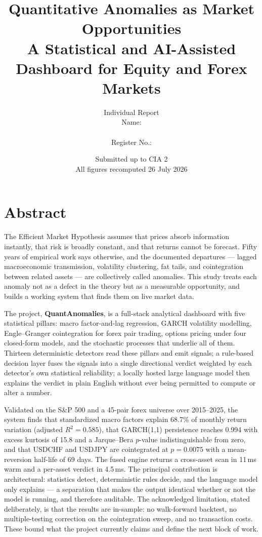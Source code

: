 \documentclass[11pt,a4paper]{article}
\title{\textbf{Quantitative Anomalies as Market Opportunities}\\[4pt]
\large A Statistical and AI-Assisted Dashboard for Equity and Forex Markets}
\author{Individual Report \\ \small Name: \rule{4cm}{0.4pt} \quad Register No.: \rule{3cm}{0.4pt}}
\date{Submitted up to CIA 2 \\ \small All figures recomputed 26 July 2026}
\begin{document}
\maketitle
\thispagestyle{empty}

\section{Abstract}

The Efficient Market Hypothesis assumes that prices absorb information instantly, that
risk is broadly constant, and that returns cannot be forecast. Fifty years of empirical
work says otherwise, and the documented departures --- lagged macroeconomic transmission,
volatility clustering, fat tails, and cointegration between related assets --- are
collectively called anomalies. This study treats each anomaly not as a defect in the
theory but as a measurable opportunity, and builds a working system that finds them on
live market data.

The project, \textbf{QuantAnomalies}, is a full-stack analytical dashboard with five
statistical pillars: macro factor-and-lag regression, GARCH volatility modelling,
Engle--Granger cointegration for forex pair trading, options pricing under four
closed-form models, and the stochastic processes that underlie all of them. Thirteen
deterministic detectors read these pillars and emit signals; a rule-based decision layer
fuses the signals into a single directional verdict weighted by each detector's own
statistical reliability; a locally hosted large language model then explains the verdict
in plain English without ever being permitted to compute or alter a number.

Validated on the S\&P 500 and a 45-pair forex universe over 2015--2025, the system finds
that standardized macro factors explain 68.7\% of monthly return variation (adjusted
$R^2 = 0.585$), that GARCH(1,1) persistence reaches 0.994 with excess kurtosis of 15.8
and a Jarque--Bera $p$-value indistinguishable from zero, and that USDCHF and USDJPY are
cointegrated at $p = 0.0075$ with a mean-reversion half-life of 69 days. The fused engine
returns a cross-asset scan in 11\,ms warm and a per-asset verdict in 4.5\,ms. The
principal contribution is architectural: statistics detect, deterministic rules decide,
and the language model only explains --- a separation that makes the output identical
whether or not the model is running, and therefore auditable. The acknowledged
limitation, stated deliberately, is that the results are in-sample: no walk-forward
backtest, no multiple-testing correction on the cointegration sweep, and no transaction
costs. These bound what the project currently claims and define the next block of work.
\end{document}
